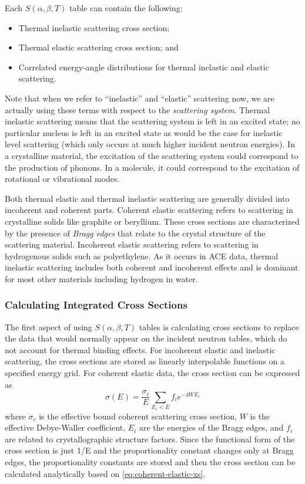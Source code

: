 Each $S(\alpha,\beta,T)$ table can contain the following:
\begin{itemize}
\item Thermal inelastic scattering cross section;
\item Thermal elastic scattering cross section; and
\item Correlated energy-angle distributions for thermal inelastic and elastic
  scattering.
\end{itemize}
Note that when we refer to ``inelastic'' and ``elastic'' scattering now, we are
actually using these terms with respect to the \emph{scattering system}. Thermal
inelastic scattering means that the scattering system is left in an excited
state; no particular nucleus is left in an excited state as would be the case
for inelastic level scattering (which only occurs at much higher incident
neutron energies). In a crystalline material, the excitation of the scattering
system could correspond to the production of phonons. In a molecule, it could
correspond to the excitation of rotational or vibrational modes.

Both thermal elastic and thermal inelastic scattering are generally divided into
incoherent and coherent parts. Coherent elastic scattering refers to scattering
in crystalline solids like graphite or beryllium. These cross sections are
characterized by the presence of \emph{Bragg edges} that relate to the crystal
structure of the scattering material. Incoherent elastic scattering refers to
scattering in hydrogenous solids such as polyethylene. As it occurs in ACE data,
thermal inelastic scattering includes both coherent and incoherent effects and
is dominant for most other materials including hydrogen in water.

\subsubsection{Calculating Integrated Cross Sections}

The first aspect of using $S(\alpha,\beta,T)$ tables is calculating
cross sections to replace the data that would normally appear on the incident
neutron tables, which do not account for thermal binding effects. For incoherent
elastic and inelastic scattering, the cross sections are stored as linearly
interpolable functions on a specified energy grid. For coherent elastic data,
the cross section can be expressed as
\begin{equation}
  \label{eq:coherent-elastic-xs}
  \sigma(E) = \frac{\sigma_c}{E} \sum_{E_i < E} f_i e^{-4WE_i}
\end{equation}
where $\sigma_c$ is the effective bound coherent scattering cross section, $W$
is the effective Debye-Waller coefficient, $E_i$ are the energies of the Bragg
edges, and $f_i$ are related to crystallographic structure factors. Since the
functional form of the cross section is just 1/E and the proportionality
constant changes only at Bragg edges, the proportionality constants are stored
and then the cross section can be calculated analytically based on
\eqref{eq:coherent-elastic-xs}.

